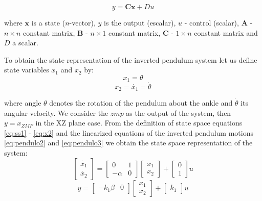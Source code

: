\begin{equation}
y = \mathbf{C}\textbf{x} + Du
\label{eq:ss2}
\end{equation}

where $\mathbf{x}$ is a state ($n$-vector), $y$ is the output (escalar), $u$ - control (scalar), $\mathbf{A}$ - $n \times n$ constant  matrix, $\mathbf{B}$ - $n \times 1$ constant matrix, $\mathbf{C}$ - $1 \times n$ constant matrix and $D$ a scalar.

To obtain the state representation of the inverted pendulum system let us define state variables $x_1$ and $x_2$ by:
\begin{equation}
x_1 = \theta
\label{eq:x1}
\end{equation}
\begin{equation}
x_2 = \dot{x_1} = \dot{\theta}
\label{eq:x2}
\end{equation} 

where angle $\theta$ denotes the rotation of the pendulum about the ankle and $\dot{\theta}$ its angular velocity. We consider the $zmp$ as the output of the system, then $y = x_{ZMP}$ in the XZ plane case. From the definition of state space equations \eqref{eq:ss1} - \eqref{eq:x2} and the linearized equations of the inverted pendulum motions \eqref{eq:pendulo2} and \eqref{eq:pendulo3} we obtain the state space representation of the system:
\begin{equation}
\begin{bmatrix}
\dot{x_1} \\
\dot{x_2}
\end{bmatrix} 
= 
\begin{bmatrix}
0 & 1 \\
-\alpha & 0
\end{bmatrix}
\begin{bmatrix}
x_1 \\
x_2
\end{bmatrix}
+
\begin{bmatrix}
0 \\
1
\end{bmatrix}
u
\label{eq:state_space}
\end{equation}
\begin{equation}
y = \begin{bmatrix}
-k_1\beta & 0 
\end{bmatrix}
\begin{bmatrix}
x_1 \\
x_2
\end{bmatrix}
+ \begin{bmatrix}
k_1
\end{bmatrix}
u
\label{eq:state_space_out}
\end{equation}
